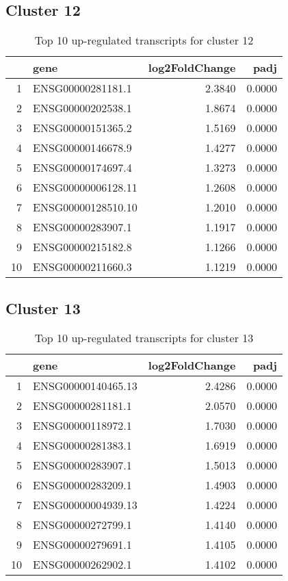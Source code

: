 \documentclass{article}
\begin{document}
\subsection{Cluster 12 }
\begin{table}[H]
\centering
\begin{tabular}{rlrr}
  \hline
 & gene & log2FoldChange & padj \\ 
  \hline
1 & ENSG00000281181.1 & 2.3840 & 0.0000 \\ 
  2 & ENSG00000202538.1 & 1.8674 & 0.0000 \\ 
  3 & ENSG00000151365.2 & 1.5169 & 0.0000 \\ 
  4 & ENSG00000146678.9 & 1.4277 & 0.0000 \\ 
  5 & ENSG00000174697.4 & 1.3273 & 0.0000 \\ 
  6 & ENSG00000006128.11 & 1.2608 & 0.0000 \\ 
  7 & ENSG00000128510.10 & 1.2010 & 0.0000 \\ 
  8 & ENSG00000283907.1 & 1.1917 & 0.0000 \\ 
  9 & ENSG00000215182.8 & 1.1266 & 0.0000 \\ 
  10 & ENSG00000211660.3 & 1.1219 & 0.0000 \\ 
   \hline
\end{tabular}
\caption{Top 10 up-regulated transcripts for cluster 12} 
\label{tab:q3_1_12}
\end{table}
\subsection{Cluster 13 }
\begin{table}[H]
\centering
\begin{tabular}{rlrr}
  \hline
 & gene & log2FoldChange & padj \\ 
  \hline
1 & ENSG00000140465.13 & 2.4286 & 0.0000 \\ 
  2 & ENSG00000281181.1 & 2.0570 & 0.0000 \\ 
  3 & ENSG00000118972.1 & 1.7030 & 0.0000 \\ 
  4 & ENSG00000281383.1 & 1.6919 & 0.0000 \\ 
  5 & ENSG00000283907.1 & 1.5013 & 0.0000 \\ 
  6 & ENSG00000283209.1 & 1.4903 & 0.0000 \\ 
  7 & ENSG00000004939.13 & 1.4224 & 0.0000 \\ 
  8 & ENSG00000272799.1 & 1.4140 & 0.0000 \\ 
  9 & ENSG00000279691.1 & 1.4105 & 0.0000 \\ 
  10 & ENSG00000262902.1 & 1.4102 & 0.0000 \\ 
   \hline
\end{tabular}
\caption{Top 10 up-regulated transcripts for cluster 13} 
\label{tab:q3_1_13}
\end{table}
\end{document}
